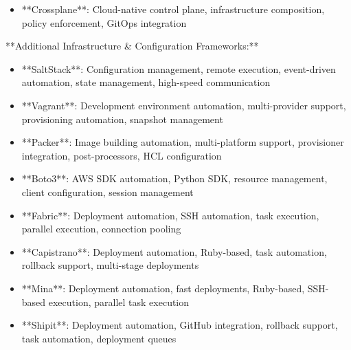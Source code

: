 \documentclass[11pt,a4paper]{article}
\begin{document}
\begin{itemize}
\item **Crossplane**: Cloud-native control plane, infrastructure composition, policy enforcement, GitOps integration
\end{itemize}

**Additional Infrastructure \& Configuration Frameworks:**

\begin{itemize}
\item **SaltStack**: Configuration management, remote execution, event-driven automation, state management, high-speed communication
\end{itemize}

\begin{itemize}
\item **Vagrant**: Development environment automation, multi-provider support, provisioning automation, snapshot management
\end{itemize}

\begin{itemize}
\item **Packer**: Image building automation, multi-platform support, provisioner integration, post-processors, HCL configuration
\end{itemize}

\begin{itemize}
\item **Boto3**: AWS SDK automation, Python SDK, resource management, client configuration, session management
\end{itemize}

\begin{itemize}
\item **Fabric**: Deployment automation, SSH automation, task execution, parallel execution, connection pooling
\end{itemize}

\begin{itemize}
\item **Capistrano**: Deployment automation, Ruby-based, task automation, rollback support, multi-stage deployments
\end{itemize}

\begin{itemize}
\item **Mina**: Deployment automation, fast deployments, Ruby-based, SSH-based execution, parallel task execution
\end{itemize}

\begin{itemize}
\item **Shipit**: Deployment automation, GitHub integration, rollback support, task automation, deployment queues
\end{itemize}
\end{document}

